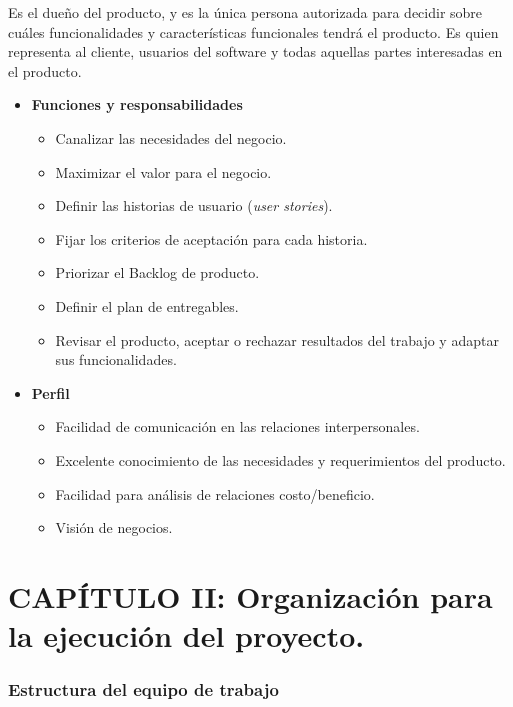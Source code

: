         Es el dueño del producto, y es la única persona autorizada para decidir sobre cuáles funcionalidades y características funcionales tendrá el producto.
        Es quien representa al cliente, usuarios del software y todas aquellas partes interesadas en el producto.
        	\begin{itemize}
			\item \textbf{Funciones y responsabilidades}
            	\begin{itemize}
				\item Canalizar las necesidades del negocio.
                \item Maximizar el valor para el negocio.
                \item Definir las historias de usuario (\textit{user stories}).
                \item Fijar los criterios de aceptación para cada historia.
                \item Priorizar el Backlog de producto.
                \item Definir el plan de entregables.
                \item Revisar el producto, aceptar o rechazar resultados del trabajo y adaptar sus funcionalidades.
				\end{itemize}
             
            \item \textbf{Perfil}
            	\begin{itemize}
				\item Facilidad de comunicación en las relaciones interpersonales.
                \item Excelente conocimiento de las necesidades y requerimientos del producto.
                \item Facilidad para análisis de relaciones costo/beneficio.
                \item Visión de negocios.
				\end{itemize}
                
			\end{itemize}


\section{CAPÍTULO II: Organización para la ejecución del proyecto.}
\subsubsection{Estructura del equipo de trabajo}

